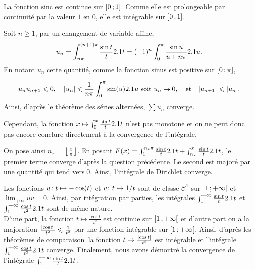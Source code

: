 \begin{demo}
\begin{reponses}
\item La fonction $\mathrm{sinc}$ est continue sur $\interof{0}{1}$. Comme elle est prolongeable par continuité par la valeur $1$ en $0$, elle est intégrable sur $\interof{0}{1}$.

\item Soit $n \geqslant 1$, par un changement de variable affine,
\[
u_n =
\int_{n\pi}^{(n+1)\pi} \frac{\sin t}{t} \d t
= (-1)^n \int_0^\pi \frac{\sin u}{u + n \pi} \d u.
\]
En notant $u_n$ cette quantité, comme la fonction sinus est positive sur $\interff{0}{\pi}$,
\begin{comment}
\item $u_n u_{n+1} \leq 0$,
\item $\abs{u_n} \leq \frac{1}{n\pi} \int_0^\pi \sin(u) \d u$ soit $u_n \to 0$,
\item $\abs{u_{n+1}} \leq \abs{u_n}$.
\end{comment}
\[
u_n u_{n+1} \leqslant 0, \quad \abs{u_n} \leqslant \frac{1}{n\pi} \int_0^\pi \sin(u) \d u \text{ soit } u_n \to 0, \quad \text{et} \quad \abs{u_{n+1}} \leqslant \abs{u_n}.
\]
Ainsi, d'après le théorème des séries alternées, $\sum u_n$ converge.

\medskip

Cependant, la fonction $x \mapsto \int_0^x \frac{\sin t}{t} \d t$ n'est pas monotone et on ne peut donc pas encore conclure directement à la convergence de l'intégrale.

On pose ainsi $n_x = \left\lfloor\frac{x}{\pi}\right\rfloor$. En posant $F(x) = \int_1^{n_x\pi} \frac{\sin t}{t} \d t + \int_{n_x}^x \frac{\sin t}{t} \d t$, le premier terme converge d'après la question précédente. Le second est majoré par une quantité qui tend vers $0$. Ainsi, l'intégrale de Dirichlet converge.

\item Les fonctions $\fonctionligne[u]{t}{-\cos(t)}$ et $\fonctionligne[v]{t}{1/t}$ sont de classe $\mathscr{C}^1$ sur $\interfo{1}{+\infty}$ et $\lim_{+\infty} u v = 0$. Ainsi, par intégration par parties, les intégrales $\int_1^{+\infty} \frac{\sin t}{t} \d t$ et $\int_1^{+\infty} \frac{\cos t}{t^2} \d t$ sont de même nature. \\
D'une part, la fonction $t \mapsto \frac{\cos t}{t^2}$ est continue sur $\interfo{1}{+\infty}$ et d'autre part on a la majoration $\frac{\abs{\cos t}}{t^2} \leqslant \frac{1}{t^2}$ par une fonction intégrable sur $\interfo{1}{+\infty}$. Ainsi, d'après les théorèmes de comparaison, la fonction $t \mapsto \frac{\abs{\cos t}}{t^2}$ est intégrable et l'intégrale $\int_1^{+\infty} \frac{\cos t}{t^2} \d t$ converge. Finalement, nous avons démontré la convergence de l'intégrale $\int_1^{+\infty} \frac{\sin t}{t} \d t$.
\end{reponses}
\end{demo}

